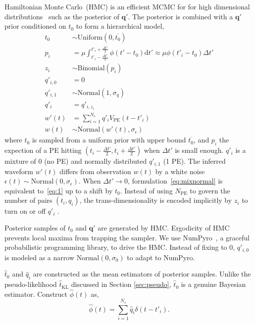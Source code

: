 Hamiltonian Monte Carlo~(HMC) is an efficient MCMC for for high dimensional distributions~\cite{neal_mcmc_2012} such as the posterior of $\bm{q'}$.  The posterior is combined with a $\bm{q'}$ prior conditioned on $t_0$ to form a hierarchical model,
\begin{equation}
  \begin{aligned}
    t_{0} &\sim \mathrm{Uniform}(0, \overline{t_0}) \\
    p_i &= \mu \int_{t'_i-\frac{\Delta t'}{2}}^{t'_i+\frac{\Delta t'}{2}} \phi(t' - t_0)\mathrm{d}t' \approx \mu\phi(t'_i - t_0)\Delta{t'}  \\
    z_i &\sim \mathrm{Binomial}(p_i) \\
    q'_{i,0}&=0\\
    q'_{i,1}& \sim \mathrm{Normal}(1, \sigma_q)\\
    q'_i &= q'_{i,z_i}\\
    w'(t) & = \sum_{i=1}^{N_s}q'_iV_\mathrm{PE}(t-t'_i)\\
    w(t) &\sim \mathrm{Normal}(w'(t), \sigma_\epsilon)
  \end{aligned}
  \label{eq:mixnormal}
\end{equation}
where $t_{0}$ is sampled from a uniform prior with upper bound $\overline{t_{0}}$, and $p_i$ the expection of a PE hitting $(t_{i} - \frac{\Delta t'}{2}, t_{i} + \frac{\Delta t'}{2})$ when $\Delta t'$ is small enough. $q'_i$ is a mixture of 0 (no PE) and normally distributed $q'_{i,1}$ (1 PE).  The inferred waveform $w'(t)$ differs from observation $w(t)$ by a white noise $\epsilon(t) \sim \mathrm{Normal}(0, \sigma_\epsilon)$.  When $\Delta{t'} \to 0$, formulation~\eqref{eq:mixnormal} is equivalent to~\eqref{eq:1} up to a shift by $t_0$.  Instead of using $N_\mathrm{PE}$ to govern the number of pairs $(t_i, q_i)$, the trans-dimensionality is encoded implicitly by $z_i$ to turn on or off $q'_i$ .

Posterior samples of $t_0$ and $\bm{q'}$ are generated by HMC.   Ergodicity of HMC prevents local maxima from trapping the sampler.  We use NumPyro~\cite{phan2019composable}, a graceful probabilistic programming library, to drive the HMC.  Instead of fixing to 0, $q'_{i,0}$ is modeled as a narrow $\mathrm{Normal}(0, \sigma_0)$ to adapt to NumPyro.

$\hat{t}_0$ and $\hat{q}_i$ are constructed as the mean estimators of posterior samples.  Unlike the pseudo-likelihood $\hat{t}_\mathrm{KL}$ discussed in Section \ref{sec:pseudo}, $\hat{t}_0$ is a genuine Bayesian estimator.  Construct $\hat{\phi}(t)$ as,
\begin{equation}
  \label{eq:mcmc-phi}
  \hat{\phi}(t) = \sum_{i=1}^{N_s}\hat{q}_i\delta(t-t'_i).
\end{equation}

